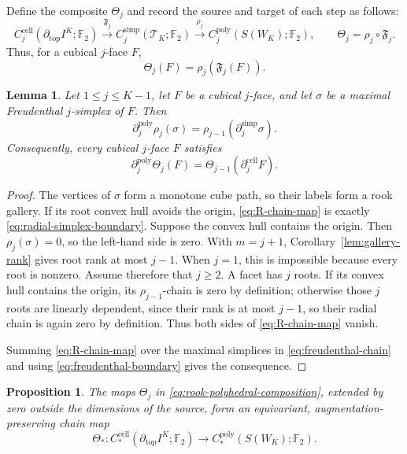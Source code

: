 \documentclass[reqno,12pt]{amsart}
\newtheorem{lemma}[theorem]{Lemma}
\newtheorem{proposition}[theorem]{Proposition}
\theoremstyle{definition}
\newcommand{\F}{\mathbb F_2}
\newcommand{\cell}{\mathrm{cell}}
\begin{document}
Define the composite \(\Theta_j\) and record the source and target of
each step as follows:
\begin{equation}\label{eq:rook-polyhedral-composition}
 C_j^{\cell}(\partial_{\mathrm{top}}I^K;\F)
 \xrightarrow{\ \mathfrak F_j\ }
 C_j^{\mathrm{simp}}(\mathcal T_K;\F)
 \xrightarrow{\ \rho_j\ }
 C_j^{\mathrm{poly}}(S(W_K);\F),
 \qquad
 \Theta_j=\rho_j\circ\mathfrak F_j.
\end{equation}
Thus, for a cubical \(j\)-face \(F\),
\[
 \Theta_j(F)=\rho_j(\mathfrak F_j(F)).
\]

\begin{lemma}
\label{lem:rook-polyhedral-boundary}
Let \(1\leq j\leq K-1\), let \(F\) be a cubical \(j\)-face, and let
\(\sigma\) be a maximal Freudenthal \(j\)-simplex of \(F\).  Then
\begin{equation}\label{eq:R-chain-map}
 \partial_j^{\mathrm{poly}}\rho_j(\sigma)
 =\rho_{j-1}(\partial_j^{\mathrm{simp}}\sigma).
\end{equation}
Consequently, every cubical \(j\)-face \(F\) satisfies
\begin{equation}\label{eq:theta-boundary}
 \partial_j^{\mathrm{poly}}\Theta_j(F)
 =\Theta_{j-1}(\partial_j^{\cell}F).
\end{equation}
\end{lemma}

\begin{proof}
The vertices of \(\sigma\) form a monotone cube path, so their
labels form a rook gallery.
If its root convex hull avoids the origin,
\eqref{eq:R-chain-map} is exactly
\eqref{eq:radial-simplex-boundary}.  Suppose the convex hull contains the
origin.  Then \(\rho_j(\sigma)=0\), so the left-hand side is zero.
With \(m=j+1\), Corollary~\ref{lem:gallery-rank} gives root rank at most
\(j-1\).  When \(j=1\), this is impossible because every root is
nonzero.  Assume therefore that \(j\geq2\).  A facet has \(j\) roots.
If its convex hull contains the origin, its \(\rho_{j-1}\)-chain is
zero by definition; otherwise those \(j\) roots are linearly dependent,
since their rank is at most \(j-1\), so their radial chain is again zero
by definition.  Thus both sides of
\eqref{eq:R-chain-map} vanish.

Summing \eqref{eq:R-chain-map} over the maximal simplices in
\eqref{eq:freudenthal-chain} and using
\eqref{eq:freudenthal-boundary} gives the consequence.
\end{proof}

\begin{proposition}\label{prop:polyhedral-rook-chain}
The maps \(\Theta_j\) in
\eqref{eq:rook-polyhedral-composition}, extended by zero outside the
dimensions of the source, form an equivariant,
augmentation-preserving chain map
\[
 \Theta_*:
 C_*^{\cell}(\partial_{\mathrm{top}}I^K;\F)
 \longrightarrow
 C_*^{\mathrm{poly}}(S(W_K);\F).
\]
\end{proposition}
\end{document}

